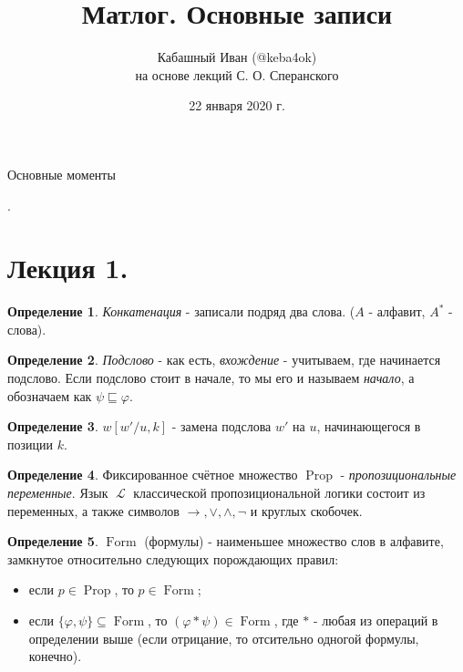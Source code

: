 \documentclass[a4paper,100pt]{article}
\title{Матлог. Основные записи}
\author{Кабашный Иван (@keba4ok) \\ на основе лекций С. О. Сперанского}
\date{22 января 2020 г.}
\theoremstyle{indented}
\theoremstyle{definition}
\newtheorem{defn}{Определение}
\theoremstyle{remark}
\DeclareMathOperator{\Prop}{Prop}
\DeclareMathOperator{\LL}{\mathscr{L}}
\DeclareMathOperator{\form}{Form}
\begin{document}
\newcommand{\resetexlcounters}{%
  \setcounter{exl}{0}%
} 

\newcommand{\resetremarkcounters}{%
  \setcounter{remark}{0}%
} 

\newcommand{\reseconscounters}{%
  \setcounter{cons}{0}%
} 

\newcommand{\resetall}{%
    \resetexlcounters
    \resetremarkcounters
    \reseconscounters%
}

\maketitle 

\newpage

\hypertarget{t1}{Основные моменты}. 
\tableofcontents

\newpage

\section{Лекция 1.}

\begin{defn}
  \textit{Конкатенация} - записали подряд два слова. ($A$ - алфавит, $A^*$ - слова).
\end{defn}

\begin{defn}
  \textit{Подслово} - как есть, \textit{вхождение} - учитываем, где начинается подслово. Если подслово стоит в начале, то мы его и называем \textit{начало}, а обозначаем как $\psi \sqsubseteq \varphi$.
\end{defn}

\begin{defn}
  $w[w'/u, k]$ - замена подслова $w'$ на $u$, начинающегося в позиции $k$.
\end{defn}

\begin{defn}
  Фиксированное счётное множество $\Prop$ - \textit{пропозициональные переменные}. Язык $\LL$ классической пропозициональной логики состоит из переменных, а также символов $\rightarrow, \vee, \wedge, \neg$ и круглых скобочек.
\end{defn}

\begin{defn}
  $\form$ (формулы) - наименьшее множество слов в алфавите, замкнутое относительно следующих порождающих правил:
  \begin{itemize}
    \item если $p\in \Prop$, то $p\in \form$; 
    \item если $\{\varphi, \psi\}\subseteq \form$, то $(\varphi*\psi)\in \form$, где $*$ - любая из операций в определении выше (если отрицание, то отсительно одногой формулы, конечно).
  \end{itemize}
\end{defn}
\end{document}
